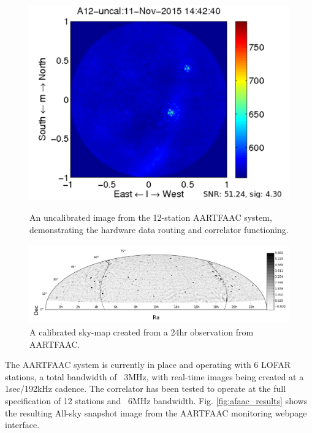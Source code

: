 \documentclass{ws-jai}
\begin{document}
\begin{figure}[htbp]
 \begin {minipage}{\textwidth}
   \includegraphics[width=\textwidth]{Figs/A12_uncal.png}
\caption{An uncalibrated image from the 12-station AARTFAAC system, demonstrating the hardware data routing and  correlator functioning.}
\label{fig:afaac_results}
 \end {minipage}
 
\begin {minipage}{\textwidth}
   \includegraphics[width=\textwidth]{Figs/24hr_skymap_grey.png}
\caption{A calibrated sky-map created from a 24hr observation from AARTFAAC.}
\label{fig:afaac_24hr}
 \end {minipage}
  
\end{figure}
The AARTFAAC system is currently in place and operating with 6 LOFAR stations, a
total bandwidth of  ~3MHz, with real-time images being created  at a 1sec/192kHz
cadence. The correlator has been tested  to operate at the full specification of
12  stations  and  ~6MHz  bandwidth.  Fig.   \ref{fig:afaac_results}  shows  the
resulting All-sky snapshot image from the AARTFAAC monitoring webpage interface.
\end{document}
